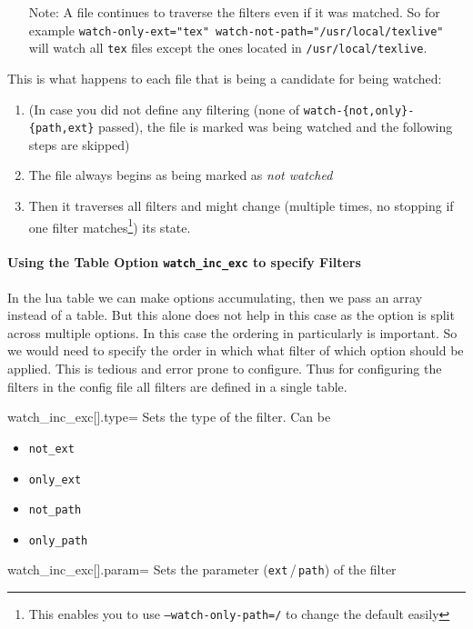 \documentclass[a4paper, 11pt]{scrartcl}
\begin{document}
\begin{itemize}
	\item[Note:] A file continues to traverse the filters even if it was matched.
		So for example \texttt{watch-only-ext="tex" watch-not-path="/usr/local/texlive"} will watch all \texttt{tex} files except the ones located in \texttt{/usr/local/texlive}.
\end{itemize}

This is what happens to each file that is being a candidate for being watched:
\begin{enumerate}
	\item (In case you did not define any filtering (none of \texttt{watch-\{not,only\}-\{path,ext\}} passed), the file is marked was being watched and the following steps are skipped)
	\item The file always begins as being marked as \emph{not watched}
	\item Then it traverses all filters and might change (multiple times, no stopping if one filter matches\footnote{
		This enables you to use \texttt{--watch-only-path=/} to change the default easily
	}) its state.
\end{enumerate}

\paragraph{Using the Table Option \texttt{watch\_inc\_exc} to specify Filters}
In the lua table we can make options accumulating, then we pass an array instead of a table.
But this alone does not help in this case as the option is split across multiple options.
In this case the ordering in particularly is important.
So we would need to specify the order in which what filter of which option should be applied.
This is tedious and error prone to configure.
Thus for configuring the filters in the config file all filters are defined in a single table.

\begin{docKey}[config][
	]{watch_inc_exc[].type}{=}{}
	Sets the type of the filter. Can be
	\begin{multicols}{4}
		\begin{itemize}
			\item \texttt{not\_ext}
			\item \texttt{only\_ext}
			\item \texttt{not\_path}
			\item \texttt{only\_path}
		\end{itemize}
	\end{multicols}
\end{docKey}
\begin{docKey}[config][
	]{watch_inc_exc[].param}{=}{}
	Sets the parameter (\texttt{ext}\,/\,\texttt{path}) of the filter
\end{docKey}
\end{document}
